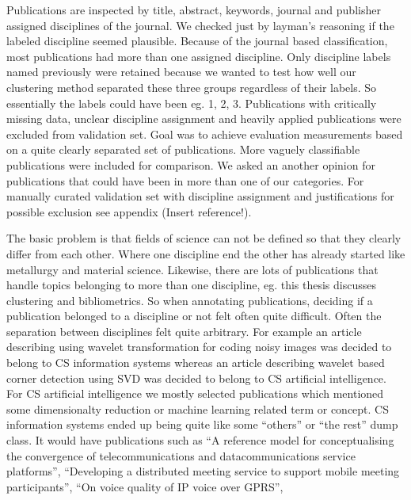Publications are inspected by title, abstract, keywords, journal
and publisher assigned disciplines of the journal. We checked 
just by layman's reasoning if the labeled discipline seemed 
plausible. Because of the journal based 
classification, most publications had more than one 
assigned discipline. Only discipline labels named 
previously were retained because we wanted to test 
how well our clustering method separated these three 
groups regardless of their labels. So essentially the 
labels could have been eg. 1, 2, 3. Publications
with critically missing data, unclear discipline assignment and
heavily applied publications were excluded from validation set.
Goal was to achieve evaluation measurements based on a quite 
clearly separated set of publications. More vaguely classifiable
publications were included for comparison. We asked an another 
opinion for publications that could have been in more 
than one of our categories. For manually curated validation set 
with discipline assignment and justifications for
possible exclusion see appendix (Insert reference!).

The basic problem is that fields of science can not be 
defined so that they clearly differ from each other. Where one 
discipline end the other has already started like metallurgy and 
material science. Likewise, there are lots of publications that 
handle topics belonging to more than one discipline, eg. this 
thesis discusses clustering and bibliometrics. So when annotating 
publications, deciding if a publication belonged to
a discipline or not felt often quite difficult. Often the 
separation between disciplines felt quite arbitrary. For example
an article describing using wavelet transformation for coding noisy
images was decided to belong to CS information systems whereas an
article describing wavelet based corner detection using SVD was
decided to belong to CS artificial intelligence.
For CS artificial intelligence we mostly selected publications 
which mentioned some dimensionalty reduction or machine learning 
related term or concept. CS information systems ended up being 
quite like some ``others'' or
``the rest'' dump class. It would have publications such as
``A reference model for conceptualising the convergence of 
telecommunications and datacommunications service platforms'',
``Developing a distributed meeting service to support mobile 
meeting participants'',
``On voice quality of IP voice over GPRS'',

